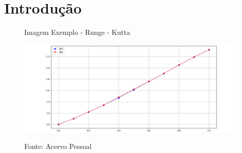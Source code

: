 \chapter{Introdução}
\pagestyle{myheadings}
\setcounter{page}{1}

\begin{figure}[h]
	\centering
	\caption{Imagem Exemplo - Runge - Kutta}
	\includegraphics[width=1.0\linewidth]{Figuras/Figure_1}
	\label{fig:figure1}
	\caption*{Fonte: Acervo Pessoal}
\end{figure}
